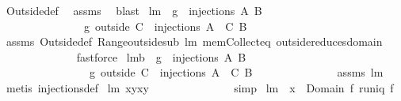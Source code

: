 \begin{isabellebody}
\ Outside{\isacharunderscore}def\ \isamarkupfalse%
\ assms\ \isamarkupfalse%
\ blast%
\endisatagproof
{\isafoldproof}%
%
\isadelimproof
\isanewline
%
\endisadelimproof
\isanewline
{}\isamarkupfalse%
\ lm{}{}{\isacharcolon}\ \ {\isachardoublequoteopen}g\ {\isasymin}\ injections{\isacharprime}\ A\ B{\isachardoublequoteclose}\ \isanewline
\ \ \ \ \ \ \ \ \ \ \ \ \ \ \ {\isachardoublequoteopen}g\ outside\ C\ {\isasymin}\ injections{\isacharprime}\ {\isacharparenleft}A\ {\isacharminus}\ C{\isacharparenright}\ B{\isachardoublequoteclose}\ \isanewline
%
\isadelimproof
\ \ \ \ \ \ \ \ \ \ \ \ %
\endisadelimproof
%
\isatagproof
{}\isamarkupfalse%
\ assms\ Outside{\isacharunderscore}def\ Range{\isacharunderscore}outside{\isacharunderscore}sub\ lm{}{}\ mem{\isacharunderscore}Collect{\isacharunderscore}eq\ outside{\isacharunderscore}reduces{\isacharunderscore}domain\isanewline
\ \ \ \ \ \ \ \ \ \ \ \ \isamarkupfalse%
\ fastforce%
\endisatagproof
{\isafoldproof}%
%
\isadelimproof
\isanewline
%
\endisadelimproof
\isanewline
{}\isamarkupfalse%
\ lm{}{}b{\isacharcolon}\ \ {\isachardoublequoteopen}g\ {\isasymin}\ injections\ A\ B{\isachardoublequoteclose}\ \isanewline
\ \ \ \ \ \ \ \ \ \ \ \ \ \ \ \ {\isachardoublequoteopen}g\ outside\ C\ {\isasymin}\ injections\ {\isacharparenleft}A\ {\isacharminus}\ C{\isacharparenright}\ B{\isachardoublequoteclose}\isanewline
%
\isadelimproof
\ \ \ \ \ \ \ \ \ \ \ \ \ %
\endisadelimproof
%
\isatagproof
{}\isamarkupfalse%
\ assms\ lm{}{}\ \isamarkupfalse%
\ {\isacharparenleft}metis\ injections{\isacharunderscore}def{\isacharparenright}%
\endisatagproof
{\isafoldproof}%
%
\isadelimproof
\isanewline
%
\endisadelimproof
\isanewline
{}\isamarkupfalse%
\ lm{}{}{\isacharcolon}\ {\isachardoublequoteopen}{\isacharbraceleft}x{\isacharbraceright}{\isasymtimes}{\isacharbraceleft}y{\isacharbraceright}{\isacharequal}{\isacharbraceleft}{\isacharparenleft}x{\isacharcomma}y{\isacharparenright}{\isacharbraceright}{\isachardoublequoteclose}\ \isanewline
%
\isadelimproof
\ \ \ \ \ \ \ \ \ \ \ \ %
\endisadelimproof
%
\isatagproof
{}\isamarkupfalse%
\ simp%
\endisatagproof
{\isafoldproof}%
%
\isadelimproof
\isanewline
%
\endisadelimproof
\isanewline
{}\isamarkupfalse%
\ lm{}{}{\isacharcolon}\ \ {\isachardoublequoteopen}x\ {\isasymin}\ Domain\ f{\isachardoublequoteclose}\ {\isachardoublequoteopen}runiq\ f{\isachardoublequoteclose}\ \isanewline

\end{isabellebody}
